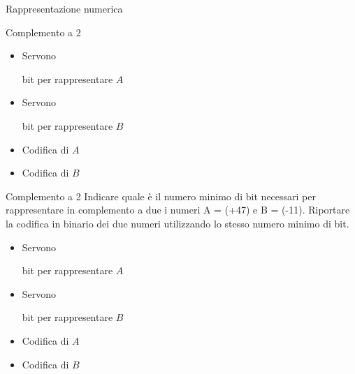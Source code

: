 \documentclass[11pt]{article}
\begin{document}
\begin{quiz}{Rappresentazione numerica}
\begin{cloze}[points=1,shuffle=false]{Complemento a 2}
\begin{itemize}
\item Servono  bit per rappresentare $A$
\item Servono  bit per rappresentare $B$
\item Codifica di $A$ 
\item Codifica di $B$ 
\end{itemize}
\end{cloze}

\begin{cloze}[points=1,shuffle=false]{Complemento a 2}
Indicare quale \`{e} il numero minimo di bit necessari per rappresentare in complemento a due i numeri A = (+47) e B = (-11). Riportare la codifica in binario dei due numeri utilizzando lo stesso numero minimo di bit.

\begin{itemize}
\item Servono  bit per rappresentare $A$
\item Servono  bit per rappresentare $B$
\item Codifica di $A$ 
\item Codifica di $B$ 
\end{itemize}
\end{cloze}


\end{quiz}
\end{document}
